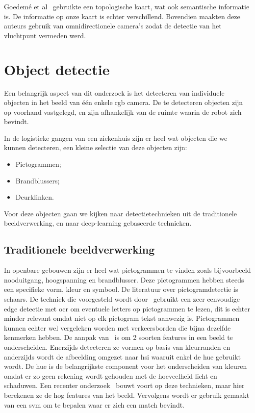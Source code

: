         Goedem\'{e} et al~\cite{goedeme2007omnidirectional} gebruikte een topologische kaart, wat ook semantische informatie is.
        De informatie op onze kaart is echter verschillend.
        Bovendien maakten deze auteurs gebruik van omnidirectionele camera's zodat de detectie van het vluchtpunt vermeden werd.
        
        
    \section{Object detectie}\label{sec:object_det}

        Een belangrijk aspect van dit onderzoek is het detecteren van individuele objecten in het beeld van \'{e}\'{e}n enkele \gls{rgb} camera.
        De te detecteren objecten zijn op voorhand vastgelegd, en zijn afhankelijk van de ruimte waarin de robot zich bevindt.

        In de logistieke gangen van een ziekenhuis zijn er heel wat objecten die we kunnen detecteren, een kleine selectie van deze objecten zijn:

        \begin{itemize}
            \item Pictogrammen;
            \item Brandblussers;
            \item Deurklinken.
        \end{itemize}

        Voor deze objecten gaan we kijken naar detectietechnieken uit de traditionele beeldverwerking, en naar deep-learning gebaseerde technieken.


        \subsection{Traditionele beeldverwerking} \label{sec:trad_obj_det}
            In openbare gebouwen zijn er heel wat pictogrammen te vinden zoals bijvoorbeeld nooduitgang, hoogspanning en brandblusser. Deze pictogrammen hebben steeds een specifieke vorm, kleur en symbool.
            De literatuur over pictogramdetectie is schaars. De techniek die voorgesteld wordt door~\cite{swathika2016} gebruikt een zeer eenvoudige edge detectie met \gls{ocr} om eventuele letters op pictogrammen te lezen, dit is echter minder relevant omdat niet op elk pictogram tekst aanwezig is. Pictogrammen kunnen echter wel vergeleken worden met verkeersborden die bijna dezelfde kenmerken hebben.
            De aanpak van~\cite{Fang2003} is om 2 soorten features in een beeld te onderscheiden. Enerzijds detecteren ze vormen op basis van kleurranden en anderzijds wordt de
            afbeelding omgezet naar \gls{hsi} waaruit enkel de hue gebruikt wordt. De hue is de belangrijkste component voor het onderscheiden van kleuren omdat er zo geen rekening wordt gehouden
            met de hoeveelheid licht en schaduwen.
            Een recenter onderzoek~\cite{Zabihi2017} bouwt voort op deze technieken, maar hier berekenen ze de \gls{hog} features van het beeld.
            Vervolgens wordt er gebruik gemaakt van een \gls{svm} om te bepalen waar er zich een match bevindt.

